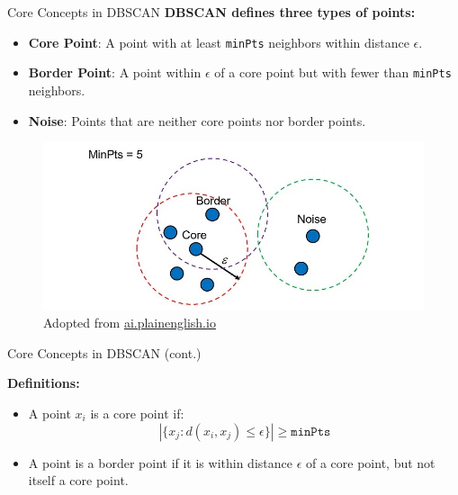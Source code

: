 \documentclass[serif, aspectratio=169]{beamer}
\begin{document}
\begin{frame}{Core Concepts in DBSCAN}
    \textbf{DBSCAN defines three types of points:}
    \begin{itemize}
        \item \textbf{Core Point}: A point with at least \texttt{minPts} neighbors within distance $ \epsilon $.
        \item \textbf{Border Point}: A point within $ \epsilon $ of a core point but with fewer than \texttt{minPts} neighbors.
        \item \textbf{Noise}: Points that are neither core points nor border points.
    \end{itemize}
    \begin{figure}
        \centering
        \includegraphics[scale = 0.5]{pic/figs/dbscanpoints.jpg}
        {\scriptsize Adopted from \href{https://ai.plainenglish.io/dbscan-density-based-clustering-aaebd76e2c8c}{ai.plainenglish.io}}
        \label{fig:dbscan-points}
    \end{figure}
\end{frame}


\begin{frame}{Core Concepts in DBSCAN (cont.)}
    
    \textbf{Definitions:}
    \begin{itemize}
        \item A point \( x_i \) is a core point if:
        \[
        |\{ x_j : d(x_i, x_j) \leq \epsilon \}| \geq \texttt{minPts}
        \]
        \item A point is a border point if it is within distance \( \epsilon \) of a core point, but not itself a core point.
    \end{itemize}
\end{frame}
\end{document}
